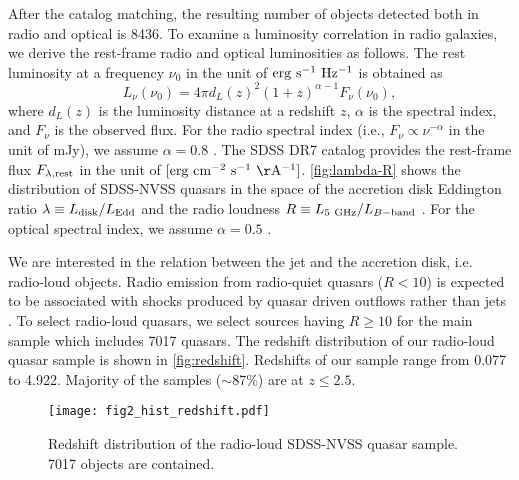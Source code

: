 \documentclass[preprint2,twocolappendix]{aastex6}
\begin{document}
After the catalog matching, the resulting number of objects detected both in radio and optical is 8436. To examine a luminosity correlation in radio galaxies, we derive the rest-frame radio and optical luminosities as follows. The rest luminosity at a frequency $\nu_0$ in the unit of ${\rm erg\ s^{-1}\ Hz^{-1}}$ is obtained as
\begin{equation}
L_{\nu} (\nu_0) = 4\pi d_L(z)^2 (1+z)^{\alpha-1} F_{\nu}(\nu_0),
\end{equation}
where $d_L(z)$ is the luminosity distance at a redshift $z$, $\alpha$ is the spectral index, and $F_\nu$ is the observed flux. For the radio spectral index (i.e., $F_\nu\propto\nu^{-\alpha}$ in the unit of mJy), we assume $\alpha=0.8$ \citep{kim08,sik13}. The SDSS DR7 catalog provides the rest-frame flux $F_{\lambda, {\rm rest}}$ in the unit of $[{\rm erg~cm^{-2}~s^{-1}~\AA^{-1}}]$. \autoref{fig:lambda-R} shows the distribution of SDSS-NVSS quasars in the space of the accretion disk Eddington ratio $\lambda\equiv L_{\rm disk}/L_{\rm Edd}$ and the radio loudness $R\equiv L_{\rm 5~GHz}/L_{B-\rm band}$ \citep[e.g.][]{sik07}. For the optical spectral index, we assume $\alpha=0.5$ \citep{ric06}.



We are interested in the relation between the jet and the accretion disk, i.e. radio-loud objects. Radio emission from radio-quiet quasars ($R<10$) is expected to be associated with shocks produced by  quasar driven outflows rather than jets \citep[e.g.][]{zak14}. To select radio-loud quasars, we select sources having $R\geq10$ for the main sample which includes 7017 quasars. The redshift distribution of our radio-loud quasar sample is shown in \autoref{fig:redshift}. Redshifts of our sample range from 0.077 to 4.922. Majority of the samples ($\sim$87\%) are at $z\le2.5$.


\begin{figure}
 \begin{center}
  \texttt{[image: fig2\_hist\_redshift.pdf]} 
 \end{center}
\caption{Redshift distribution of the radio-loud SDSS-NVSS quasar sample. 7017 objects are contained.}\label{fig:redshift}
\end{figure}
\end{document}
